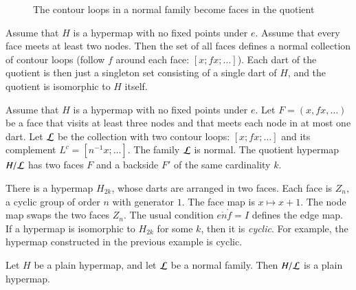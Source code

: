 \begin{figure}[htb]
  \centering
  \caption{The contour loops in a normal family become faces in the quotient}
  \label{fig:quot}
\end{figure}


\begin{example}\label{ex:Hall} 
Assume that $H$ is a hypermap with no fixed points under $e$. Assume that every face meets at least two nodes. Then the set of all faces defines a normal collection of contour loops (follow $f$ around each face: $[x;f x;\ldots]$).  Each dart of the quotient is then just a singleton set consisting of a single dart of $H$, and the quotient is isomorphic to $H$ itself.
\end{example}

\begin{example}\label{ex:H2} 
Assume that $H$ is a hypermap with no fixed points
under $e$.  Let $F = (x,f x,\ldots)$ be a face 
that visits at least
three nodes and that meets each node in at most one dart.
Let $\cal L$ be the
collection with two contour loops:  $[x;f x;\ldots]$ and its
complement $L^c = [n^{-1} x;\ldots]$.
The family $\cal L$ is normal. The quotient hypermap $H/{\cal L}$ has two faces $F$ and a backside $F'$ of the same cardinality $k$.
\end{example}





\begin{example}[cyclic]\label{ex:H2k} 
There is a hypermap $H_{2k}$, whose darts are arranged in two faces.  Each
face is $Z_n$, a cyclic group of order $n$ with generator $1$.
The face map is $x\mapsto x+1$.
The node map swaps the two faces $Z_n$.
The usual condition $e\ocirc n\ocirc f = I$ defines the edge map.
If a hypermap is isomorphic to $H_{2k}$ for
some $k$, then it is {\it cyclic}.  For example,
the hypermap constructed in the previous example is cyclic.
\end{example}

\begin{lemma}
Let $H$ be a plain hypermap, and let $\cal L$ be a
normal family.  Then $H/{\cal L}$ is a plain hypermap.
\end{lemma}

